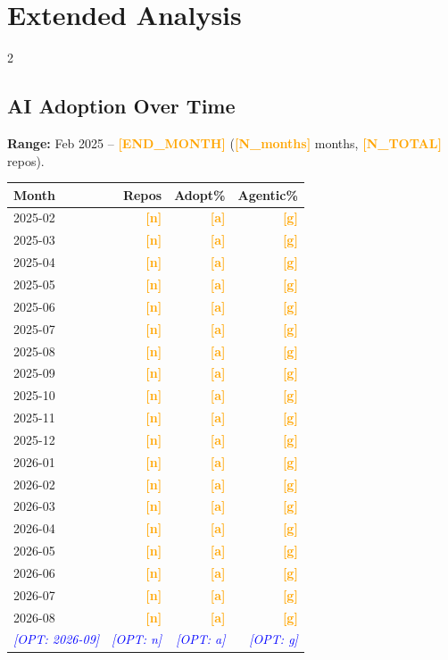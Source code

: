 \documentclass[10pt,a4paper]{article}
\newcommand{\FILLIN}[1]{\textcolor{orange}{\textbf{[#1]}}}
\newcommand{\OPT}[1]{\textcolor{blue}{\textit{[OPT: #1]}}}
\begin{document}
\section*{Extended Analysis}
\begin{multicols}{2}
\footnotesize

\subsection*{AI Adoption Over Time}
\textbf{Range:} Feb 2025 -- \FILLIN{END\_MONTH} (\FILLIN{N\_months} months, \FILLIN{N\_TOTAL} repos).

\vspace{2pt}
\begin{tabular}{@{}lrrr@{}}
\toprule
Month & Repos & Adopt\% & Agentic\% \\
\midrule
2025-02 & \FILLIN{n} & \FILLIN{a} & \FILLIN{g} \\
2025-03 & \FILLIN{n} & \FILLIN{a} & \FILLIN{g} \\
2025-04 & \FILLIN{n} & \FILLIN{a} & \FILLIN{g} \\
2025-05 & \FILLIN{n} & \FILLIN{a} & \FILLIN{g} \\
2025-06 & \FILLIN{n} & \FILLIN{a} & \FILLIN{g} \\
2025-07 & \FILLIN{n} & \FILLIN{a} & \FILLIN{g} \\
2025-08 & \FILLIN{n} & \FILLIN{a} & \FILLIN{g} \\
2025-09 & \FILLIN{n} & \FILLIN{a} & \FILLIN{g} \\
2025-10 & \FILLIN{n} & \FILLIN{a} & \FILLIN{g} \\
2025-11 & \FILLIN{n} & \FILLIN{a} & \FILLIN{g} \\
2025-12 & \FILLIN{n} & \FILLIN{a} & \FILLIN{g} \\
2026-01 & \FILLIN{n} & \FILLIN{a} & \FILLIN{g} \\
2026-02 & \FILLIN{n} & \FILLIN{a} & \FILLIN{g} \\
2026-03 & \FILLIN{n} & \FILLIN{a} & \FILLIN{g} \\
2026-04 & \FILLIN{n} & \FILLIN{a} & \FILLIN{g} \\
2026-05 & \FILLIN{n} & \FILLIN{a} & \FILLIN{g} \\
2026-06 & \FILLIN{n} & \FILLIN{a} & \FILLIN{g} \\
2026-07 & \FILLIN{n} & \FILLIN{a} & \FILLIN{g} \\
2026-08 & \FILLIN{n} & \FILLIN{a} & \FILLIN{g} \\
\OPT{2026-09} & \OPT{n} & \OPT{a} & \OPT{g} \\
\bottomrule
\end{tabular}


\end{multicols}
\end{document}
